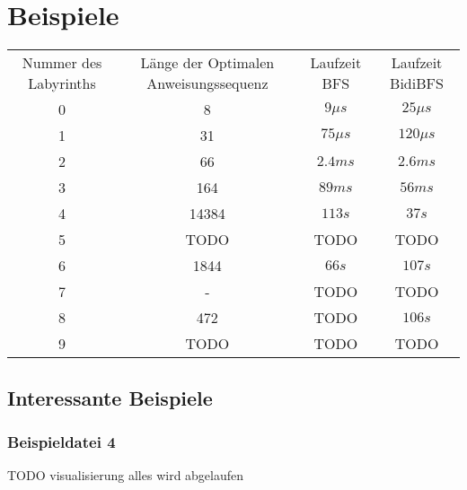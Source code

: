 \documentclass[a4paper,10pt,ngerman]{scrartcl}
\begin{document}
    \section{Beispiele}
    \begin{tabular}{||c | c | c | c||}
        Nummer des Labyrinths & Länge der Optimalen Anweisungssequenz & Laufzeit BFS & Laufzeit BidiBFS \\
        0                     & 8                                     & $9 \mu s$    & $25 \mu s$       \\
        \hline
        1                     & 31                                    & $75 \mu s$   & $120 \mu s$      \\
        \hline
        2                     & 66                                    & $2.4 ms$     & $2.6 ms$         \\
        \hline
        3                     & 164                                   & $89 ms$      & $56 ms$          \\
        \hline
        4                     & 14384                                 & $113 s$      & $37 s$           \\
        \hline
        5                     & TODO                                  & TODO         & TODO             \\
        \hline
        6                     & 1844                                  & $66 s$       & $107 s$          \\
        \hline
        7                     & -                                     & TODO         & TODO             \\
        \hline
        8                     & 472                                   & TODO         & $106 s$          \\
        \hline
        9                     & TODO                                  & TODO         & TODO             \\
    \end{tabular}

    \subsection{Interessante Beispiele}

    \subsubsection{Beispieldatei 4}
    TODO visualisierung alles wird abgelaufen
\end{document}
